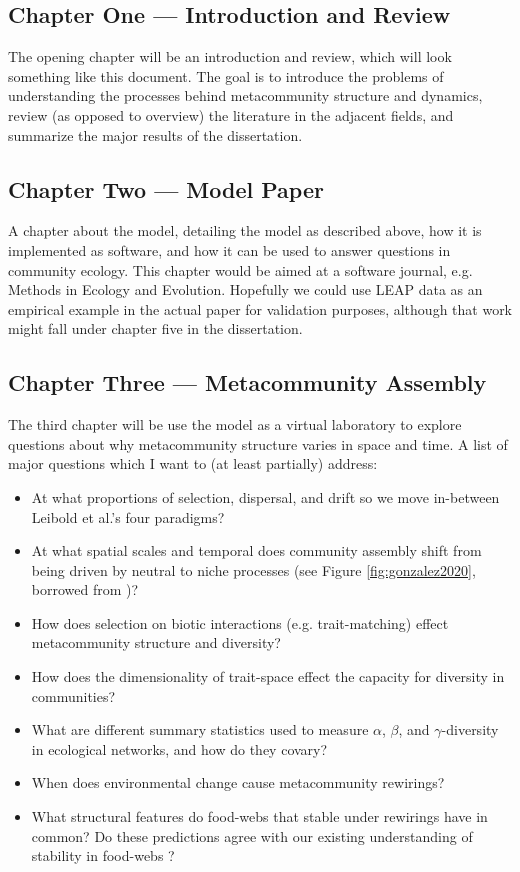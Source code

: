 \documentclass[]{article}
\begin{document}
\subsection*{Chapter One --- Introduction and Review}

The opening chapter will be an introduction and review, which will look something like this document. The goal is to introduce the problems of understanding the processes behind metacommunity structure and dynamics, review (as opposed to overview) the literature in the adjacent fields, and summarize the major results of the dissertation.

\subsection*{Chapter Two --- Model Paper}

A chapter about the model, detailing the model as described above, how it is implemented as software, and how it can be used to answer questions in community ecology. This chapter would be aimed at a software journal, e.g. Methods in Ecology and Evolution. Hopefully we could use LEAP data as an empirical example in the actual paper for validation purposes, although that work might fall under chapter five in the dissertation.


\subsection*{Chapter Three  --- Metacommunity Assembly}

The third chapter will be use the model as a virtual laboratory to explore questions about why metacommunity structure varies in space and time. A list of major questions which I want to (at least partially) address:

\begin{itemize}
    \item At what proportions of selection, dispersal, and drift so we move in-between Leibold et al.'s four paradigms?
    \item At what spatial scales and temporal does community assembly shift from being driven by neutral to niche processes \cite{gravel_reconciling_2006} (see Figure \ref{fig:gonzalez2020}, borrowed from \cite{gonzalez_scaling-up_2020})?
    \item How does selection on biotic interactions (e.g. trait-matching) effect metacommunity structure and diversity?
    \item How does the dimensionality of trait-space effect the capacity for diversity in communities?
    \item What are different summary statistics used to measure $\alpha$, $\beta$, and $\gamma$-diversity in ecological networks, and how do they covary?
    \item When does environmental change cause metacommunity rewirings?
    \item What structural features do food-webs that stable under rewirings have in common? Do these predictions agree with our existing understanding of stability in food-webs     \cite{allesina_stability_2012}?

\end{itemize}
\end{document}

